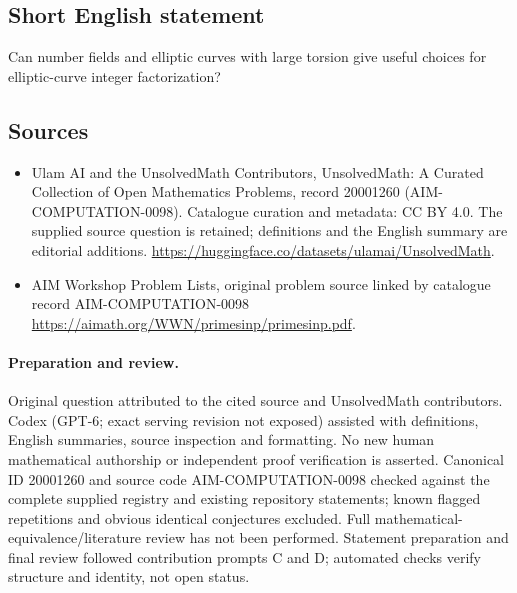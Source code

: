 \documentclass[11pt]{article}
\begin{document}
\subsection{Short English statement}
Can number fields and elliptic curves with large torsion give useful choices for elliptic-curve integer factorization?
\subsection{Sources}
\begin{itemize}
\item[\hypertarget{source:20001260:1}{S1}] Ulam AI and the UnsolvedMath Contributors, UnsolvedMath: A Curated Collection of Open Mathematics Problems, record 20001260 (AIM-COMPUTATION-0098). Catalogue curation and metadata: CC BY 4.0. The supplied source question is retained; definitions and the English summary are editorial additions.
\url{https://huggingface.co/datasets/ulamai/UnsolvedMath}.
\item[\hypertarget{source:20001260:2}{S2}] AIM Workshop Problem Lists, original problem source linked by catalogue record AIM-COMPUTATION-0098
\url{https://aimath.org/WWN/primesinp/primesinp.pdf}.
\end{itemize}
\paragraph{Preparation and review.}
Original question attributed to the cited source and UnsolvedMath contributors. Codex (GPT-6; exact serving revision not exposed) assisted with definitions, English summaries, source inspection and formatting. No new human mathematical authorship or independent proof verification is asserted. Canonical ID 20001260 and source code AIM-COMPUTATION-0098 checked against the complete supplied registry and existing repository statements; known flagged repetitions and obvious identical conjectures excluded. Full mathematical-equivalence/literature review has not been performed. Statement preparation and final review followed contribution prompts C and D; automated checks verify structure and identity, not open status.
\label{end:20001260}
\end{document}
